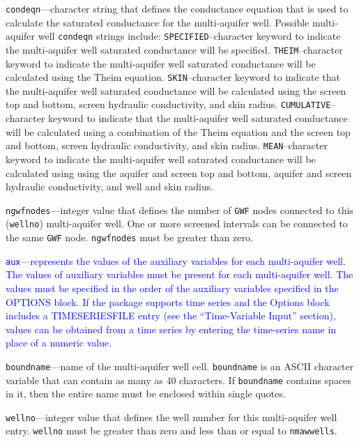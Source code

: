 \item \texttt{condeqn}---character string that defines the conductance equation that is used to calculate the saturated conductance for the multi-aquifer well. Possible multi-aquifer well \texttt{condeqn} strings include: \texttt{SPECIFIED}--character keyword to indicate the multi-aquifer well saturated conductance will be specified.  \texttt{THEIM}--character keyword to indicate the multi-aquifer well saturated conductance will be calculated using the Theim equation.  \texttt{SKIN}--character keyword to indicate that the multi-aquifer well saturated conductance will be calculated using the screen top and bottom, screen hydraulic conductivity, and skin radius.    \texttt{CUMULATIVE}--character keyword to indicate that the multi-aquifer well saturated conductance will be calculated using a combination of the Theim equation and the screen top and bottom, screen hydraulic conductivity, and skin radius.  \texttt{MEAN}--character keyword to indicate the multi-aquifer well saturated conductance will be calculated using using the aquifer and screen top and bottom, aquifer and screen hydraulic conductivity, and well and skin radius.

\item \texttt{ngwfnodes}---integer value that defines the number of \texttt{GWF} nodes connected to this (\texttt{wellno}) multi-aquifer well. One or more screened intervals can be connected to the same \texttt{GWF} node. \texttt{ngwfnodes} must be greater than zero.

\item \textcolor{blue}{\texttt{aux}---represents the values of the auxiliary variables for each multi-aquifer well. The values of auxiliary variables must be present for each multi-aquifer well. The values must be specified in the order of the auxiliary variables specified in the OPTIONS block.  If the package supports time series and the Options block includes a TIMESERIESFILE entry (see the ``Time-Variable Input'' section), values can be obtained from a time series by entering the time-series name in place of a numeric value.}

\item \texttt{boundname}---name of the multi-aquifer well cell.  \texttt{boundname} is an ASCII character variable that can contain as many as 40 characters.  If \texttt{boundname} contains spaces in it, then the entire name must be enclosed within single quotes.

\item \texttt{wellno}---integer value that defines the well number for this multi-aquifer well entry. \texttt{wellno} must be greater than zero and less than or equal to \texttt{nmawwells}.

